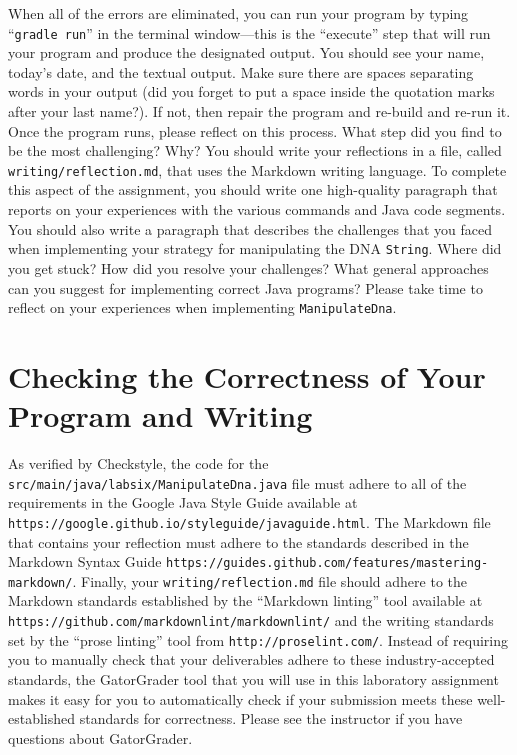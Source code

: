 \documentclass[11pt]{article}
\newcommand{\mainprogram}{\lstinline{ManipulateDna}}
\newcommand{\mainprogramsource}{\lstinline{src/main/java/labsix/ManipulateDna.java}}
\newcommand{\reflection}{\lstinline{writing/reflection.md}}
\newcommand{\gradlerun}{\command{gradle run}}
\newcommand{\command}[1]{``\lstinline{#1}''}
\newcommand{\url}[1]{\lstinline{#1}}
\newcommand{\step}[1]{``{#1}''}
\begin{document}
When all of the errors are eliminated, you can run your program by typing
\gradlerun{} in the terminal window---this is the ``execute'' step that will run
your program and produce the designated output. You should see your name,
today's date, and the textual output. Make sure there are spaces separating
words in your output (did you forget to put a space inside the quotation marks
after your last name?). If not, then repair the program and re-build and re-run
it. Once the program runs, please reflect on this process. What step did you
find to be the most challenging? Why? You should write your reflections in a
file, called \reflection{}, that uses the Markdown writing language. To complete
this aspect of the assignment, you should write one high-quality paragraph that
reports on your experiences with the various commands and Java code segments.
You should also write a paragraph that describes the challenges that you faced
when implementing your strategy for manipulating the DNA {\tt String}.
%
Where did you get stuck? How did you resolve your challenges?
%
What general approaches can you suggest for implementing correct Java programs?
%
Please take time to reflect on your experiences when implementing
\mainprogram.

\section*{Checking the Correctness of Your Program and Writing}

As verified by Checkstyle, the code for the \mainprogramsource{} file must
adhere to all of the requirements in the Google Java Style Guide available at
\url{https://google.github.io/styleguide/javaguide.html}. The Markdown file that
contains your reflection must adhere to the standards described in the Markdown
Syntax Guide \url{https://guides.github.com/features/mastering-markdown/}.
Finally, your \reflection{} file should adhere to the Markdown standards
established by the \step{Markdown linting} tool available at
\url{https://github.com/markdownlint/markdownlint/} and the writing standards
set by the \step{prose linting} tool from \url{http://proselint.com/}. Instead
of requiring you to manually check that your deliverables adhere to these
industry-accepted standards, the GatorGrader tool that you will use in this
laboratory assignment makes it easy for you to automatically check if your
submission meets these well-established standards for correctness. Please see
the instructor if you have questions about GatorGrader.
\end{document}
